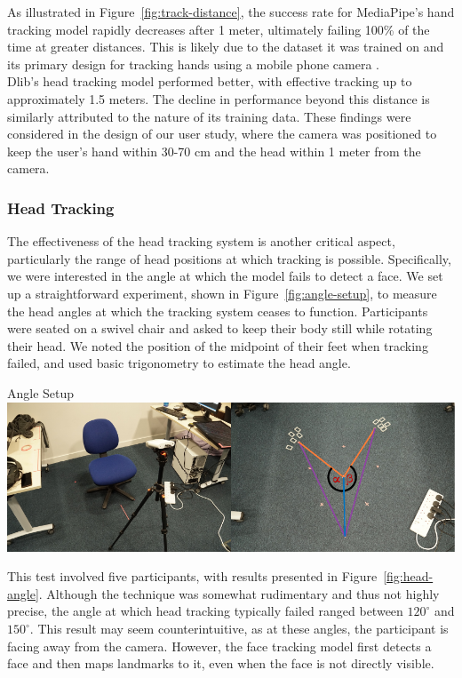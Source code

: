 As illustrated in Figure~\ref{fig:track-distance}, the success rate for MediaPipe's hand tracking model rapidly decreases after 1 meter, ultimately failing 100\% of the time at greater distances. This is likely due to the dataset it was trained on and its primary design for tracking hands using a mobile phone camera \cite{dlib09}. \\

Dlib's head tracking model performed better, with effective tracking up to approximately 1.5 meters. The decline in performance beyond this distance is similarly attributed to the nature of its training data. These findings were considered in the design of our user study, where the camera was positioned to keep the user's hand within 30-70 cm and the head within 1 meter from the camera.

\subsubsection{Head Tracking}

The effectiveness of the head tracking system is another critical aspect, particularly the range of head positions at which tracking is possible. Specifically, we were interested in the angle at which the model fails to detect a face. We set up a straightforward experiment, shown in Figure~\ref{fig:angle-setup}, to measure the head angles at which the tracking system ceases to function. Participants were seated on a swivel chair and asked to keep their body still while rotating their head. We noted the position of the midpoint of their feet when tracking failed, and used basic trigonometry to estimate the head angle.

\begin{figureBox}[label={fig:angle-setup}, width=1.0\linewidth]{Angle Setup}
    \includegraphics[width = 1.0\linewidth]{./evaluation/figures/angle-setup.pdf}
\end{figureBox}

This test involved five participants, with results presented in Figure~\ref{fig:head-angle}. Although the technique was somewhat rudimentary and thus not highly precise, the angle at which head tracking typically failed ranged between $120^{\circ}$ and $150^{\circ}$. This result may seem counterintuitive, as at these angles, the participant is facing away from the camera. However, the face tracking model first detects a face and then maps landmarks to it, even when the face is not directly visible.

